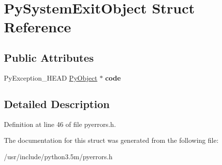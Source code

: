 \hypertarget{structPySystemExitObject}{}\section{Py\+System\+Exit\+Object Struct Reference}
\label{structPySystemExitObject}
\subsection*{Public Attributes}
\begin{DoxyCompactItemize}
\item 
Py\+Exception\+\_\+\+H\+E\+AD \hyperlink{struct__object}{Py\+Object} $\ast$ {\bfseries code}\hypertarget{structPySystemExitObject_abb05176168f7866b9082a7ff668fe14d}{}\label{structPySystemExitObject_abb05176168f7866b9082a7ff668fe14d}

\end{DoxyCompactItemize}


\subsection{Detailed Description}


Definition at line 46 of file pyerrors.\+h.



The documentation for this struct was generated from the following file\+:\begin{DoxyCompactItemize}
\item 
/usr/include/python3.\+5m/pyerrors.\+h\end{DoxyCompactItemize}

